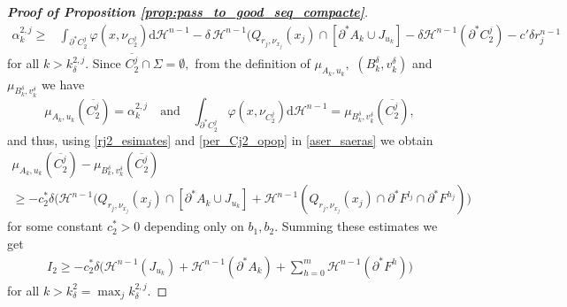 \documentclass[reqno]{amsart}
\numberwithin{equation}{section}
\theoremstyle{plain}
\theoremstyle{definition}
\newcommand{\cH}{\mathcal{H}}
\newcommand{\p}{\partial}
\newcommand{\cl}[1]{\overline{#1}}
\newcommand{\bound}{b}
\renewcommand{\d}{\mathrm{d}}
\begin{document}
\begin{proof}[\textbf{Proof of Proposition \ref{prop:pass_to_good_seq_compacte}}]
\begin{align}\label{aser_saeras}
\alpha_k^{2,j}\ge & \int_{\p^* C_2^j} \varphi(x,\nu_{C_2^j})\d\cH^{n-1} - \delta\, \cH^{n-1}(Q_{r_j,\nu_{x_j}}(x_j) \cap [\p^*A_k\cup J_{u_k}] - \delta \cH^{n-1}(\p^*C_2^j) - c'\delta r_j^{n-1}
\end{align}
for all $k>k_\delta^{2,j}.$
Since $\cl{C_2^j}\cap\Sigma=\emptyset,$ from the definition of $\mu_{A_k,u_k},$ $(B_k^\delta,v_k^\delta)$ and $\mu_{B_k^\delta,v_k^\delta}$ we have 
$$
\mu_{A_k,u_k}(\cl{C_2^j}) = \alpha_k^{2,j}\quad\text{and}\quad 
\int_{\p^* C_2^j} \varphi(x,\nu_{C_2^j})\d\cH^{n-1} = \mu_{B_k^\delta,v_k^\delta}(\cl{C_2^j}),
$$
and thus, using \eqref{rj2_esimates} and \eqref{per_Cj2_opop} in \eqref{aser_saeras} we obtain
\begin{multline*}
\mu_{A_k,u_k}(\cl{C_2^j}) - 
 \mu_{B_k^\delta,v_k^\delta}(\cl{C_2^j}) \\
 \ge 
 -c_2^*\delta \Big( \cH^{n-1}(Q_{r_j,\nu_{x_j}}(x_j) \cap [\p^*A_k\cup J_{u_k}] + \cH^{n-1}(Q_{r_j,\nu_{x_j}}(x_j) \cap \p^*F^{l_j}\cap \p^*F^{h_j})\Big)
\end{multline*}
for some constant $c_2^*>0$ depending only on $\bound_1,\bound_2.$
Summing these estimates we get
\begin{align}\label{estimos_I2oplas}
I_2 \ge   - c_2^*\delta \Big(\cH^{n-1}(J_{u_k}) + \cH^{n-1}(\p^*A_k) + \sum_{h=0}^{m}\cH^{n-1}(\p^*F^h)\Big)
\end{align}
for all $k>k_\delta^2=\max_jk_\delta^{2,j}.$



\end{proof}
\end{document}
